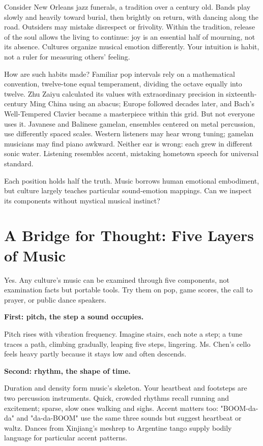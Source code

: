 Consider New Orleans jazz funerals, a tradition over a century old. Bands play slowly and heavily toward burial, then brightly on return, with dancing along the road. Outsiders may mistake disrespect or frivolity. Within the tradition, release of the soul allows the living to continue: joy is an essential half of mourning, not its absence. Cultures organize musical emotion differently. Your intuition is habit, not a ruler for measuring others' feeling.

How are such habits made? Familiar pop intervals rely on a mathematical convention, twelve-tone equal temperament, dividing the octave equally into twelve. Zhu Zaiyu calculated its values with extraordinary precision in sixteenth-century Ming China using an abacus; Europe followed decades later, and Bach's Well-Tempered Clavier became a masterpiece within this grid. But not everyone uses it. Javanese and Balinese gamelan, ensembles centered on metal percussion, use differently spaced scales. Western listeners may hear wrong tuning; gamelan musicians may find piano awkward. Neither ear is wrong: each grew in different sonic water. Listening resembles accent, mistaking hometown speech for universal standard.

Each position holds half the truth. Music borrows human emotional embodiment, but culture largely teaches particular sound-emotion mappings. Can we inspect its components without mystical musical instinct?

\section{A Bridge for Thought: Five Layers of Music}
Yes. Any culture's music can be examined through five components, not examination facts but portable tools. Try them on pop, game scores, the call to prayer, or public dance speakers.

\textbf{First: pitch, the step a sound occupies.}

Pitch rises with vibration frequency. Imagine stairs, each note a step; a tune traces a path, climbing gradually, leaping five steps, lingering. Ms. Chen's cello feels heavy partly because it stays low and often descends.

\textbf{Second: rhythm, the shape of time.}

Duration and density form music's skeleton. Your heartbeat and footsteps are two percussion instruments. Quick, crowded rhythms recall running and excitement; sparse, slow ones walking and sighs. Accent matters too: "BOOM-da-da" and "da-da-BOOM" use the same three sounds but suggest heartbeat or waltz. Dances from Xinjiang's meshrep to Argentine tango supply bodily language for particular accent patterns.

